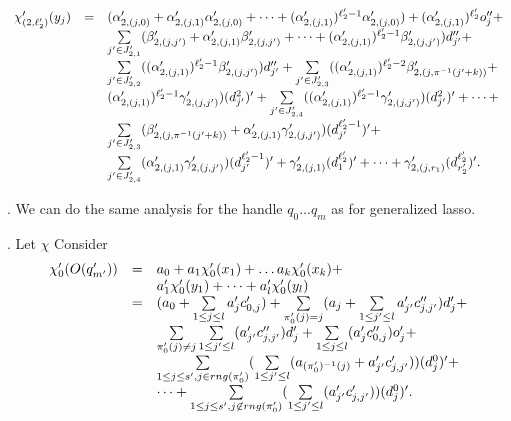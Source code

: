 \documentclass[runningheads,a4paper]{llncs}
\begin{document}
\[
\begin{array}{l c l}
\chi'_{(2,\ell'_2)}(y_j)  & = & (\alpha'_{2,(j,0)} + \alpha'_{2,(j,1)} \alpha'_{2,(j,0)}+ \dots +(\alpha'_{2,(j,1)})^{\ell'_2-1} \alpha'_{2,(j,0)}) + (\alpha'_{2,(j,1)})^{\ell'_2} o''_j + \\
& & \sum \limits_{j' \in J'_{2,1}} (\beta'_{2,(j,j')}+\alpha'_{2,(j,1)}\beta'_{2,(j,j')} + \dots +(\alpha'_{2,(j,1)})^{\ell'_2-1}  \beta'_{2,(j,j')}) d''_{j'} + \\
%
& & \sum \limits_{j' \in J'_{2,2}} ( (\alpha'_{2,(j,1)})^{\ell'_2-1} \beta'_{2,(j,j')}) d''_{j'} +  \sum \limits_{j' \in J'_{2,3}} ( (\alpha'_{2,(j,1)})^{\ell'_2-2} \beta'_{2,(j, \pi^{-1}(j'+k))}+\\
%
& &  (\alpha'_{2,(j,1)})^{\ell'_2-1} \gamma'_{2,(j,j')}) (d^2_{j'})' +  \sum \limits_{j' \in J'_{2,4}} ( (\alpha'_{2,(j,1)})^{\ell'_2-1} \gamma'_{2,(j,j')}) (d^2_{j'})' + \dots +  \\
%
& & \sum \limits_{j' \in J'_{2,3}} (\beta'_{2,(j, \pi^{-1}(j'+k))}+\alpha'_{2,(j,1)}\gamma'_{2,(j,j')}) (d^{\ell'_2-1}_{j'})' +\\
& & \sum \limits_{j' \in J'_{2,4}} (\alpha'_{2,(j,1)} \gamma'_{2,(j,j')}) (d^{\ell'_2-1}_{j'})' + \gamma'_{2,(j, 1)} (d^{\ell'_2}_{1})' + \dots + \gamma'_{2,(j,r_1)} (d^{\ell'_2}_{r'_2})'.
\end{array} 
\]

. We can do the same analysis for the handle $q_0 \dots q_m$ as for generalized lasso.

\smallskip 
{}. Let $\chi$ Consider
\[
\begin{array}{l c l}
\chi'_{0}(O(q'_{m'})) & = & a_0 + a_1 \chi'_0(x_1) + \dots a_k \chi'_0(x_k) + \\
& & a'_1 \chi'_0(y_1) + \dots + a'_l \chi'_0(y_l) \\
&  = &  (a_0+\sum \limits_{1 \le j \le l} a'_j c'_{0,j}) + \sum \limits_{\pi'_0(j)=j} (a_j + \sum \limits_{1 \le j' \le l} a'_{j'} c''_{j,j'}) d'_j  + \\
& & \sum \limits_{\pi'_0(j) \neq j} \sum \limits_{1 \le j' \le l} (a'_{j'} c''_{j,j'}) d'_j + \sum \limits_{1\le j \le l} (a'_{j} c''_{0,j}) o'_j + \\
& & \sum \limits_{1 \le j \le s', j \in rng(\pi'_0)} (\sum \limits_{1 \le j' \le l} (a_{(\pi'_0)^{-1}(j)} + a'_{j'} c'_{j,j'})) (d^0_j)' +\\ & & \dots  + \sum \limits_{1 \le j \le s', j \not \in rng(\pi'_0)} (\sum \limits_{1 \le j' \le l} (a'_{j'} c'_{j,j'})) (d^0_j)'.
\end{array}
\] 
\end{document}
